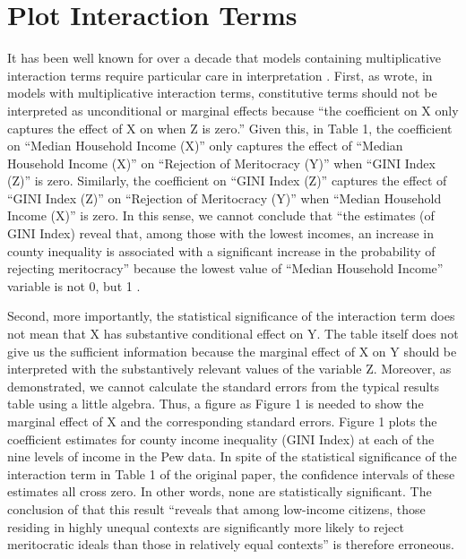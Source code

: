 
\section{Plot Interaction Terms}

It has been well known for over a decade that models containing multiplicative interaction terms require particular care in interpretation \citep[see, e.g.,][]{Golder2003, Braumoeller2004, Brambor2006, Kam2007}. First, as \citet[71-72]{Brambor2006} wrote, in models with multiplicative interaction terms, constitutive terms should not be interpreted as unconditional or marginal effects because ``the coeﬃcient on X only captures the eﬀect of X on when Z is zero.'' Given this, in Table 1, the coefficient on ``Median Household Income (X)'' only captures the effect of ``Median Household Income (X)'' on ``Rejection of Meritocracy (Y)'' when ``GINI Index (Z)'' is zero. Similarly, the coefficient on ``GINI Index (Z)'' captures the effect of ``GINI Index (Z)'' on ``Rejection of Meritocracy (Y)'' when ``Median Household Income (X)'' is zero. In this sense, we cannot conclude that ``the estimates (of GINI Index) reveal that, among those with the lowest incomes, an increase in county inequality is associated with a significant increase in the probability of rejecting meritocracy'' \citep[334]{Newman, Johnston, and Lown2015a} because the lowest value of ``Median Household Income'' variable is not 0, but 1 \citep{Newman2015a, 332}. 

Second, more importantly, the statistical significance of the interaction term does not mean that X has substantive conditional effect on Y. The table itself does not give us the sufficient information because the marginal effect of X on Y should be interpreted with the substantively relevant values of the variable Z. Moreover, as \citet[74]{Brambor2006} demonstrated, we cannot calculate the standard errors from the typical results table using a little algebra. Thus, a figure as Figure 1 is needed to show the marginal effect of X and the corresponding standard errors. Figure 1 plots the coeﬃcient estimates for county income inequality (GINI Index) at each of the nine levels of income in the Pew data. In spite of the statistical significance of the interaction term in Table 1 of the original paper, the conﬁdence intervals of these estimates all cross zero. In other words, none are statistically signiﬁcant. The conclusion of \citet[334]{Newman2015a} that this result ``reveals that among low-income citizens, those residing in highly unequal contexts are signiﬁcantly more likely to reject meritocratic ideals than those in relatively equal contexts'' is therefore erroneous.

